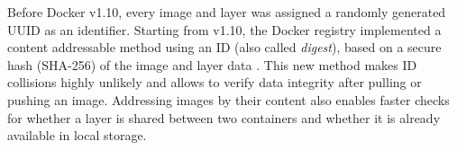 Before Docker v1.10, every image and layer was assigned a randomly generated UUID
as an identifier.
%
%
Starting from v1.10, the Docker registry implemented a content addressable method
using an ID (also called \emph{digest}), based on a secure hash (SHA-256) of the
image and layer data .
%
This new method makes ID collisions highly unlikely and allows to verify data
integrity after pulling or pushing an image.
%
%
%
%
Addressing images by their content also enables faster checks for whether a
layer is shared between two containers and whether it is already available
in local storage.
%






